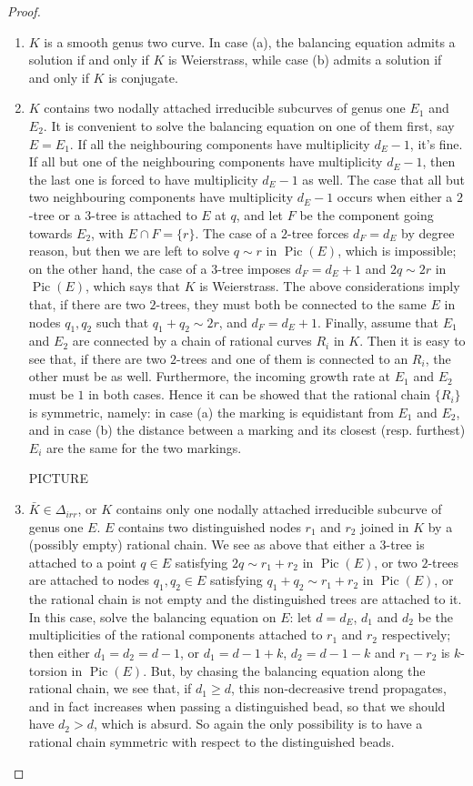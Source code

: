 \documentclass[11pt]{amsart}
\newcommand{\Pic}{\operatorname{Pic}}
\theoremstyle{plain}
\theoremstyle{definition}
\begin{document}
\begin{proof}
\begin{enumerate}
 \item $K$ is a smooth genus two curve. In case (a), the balancing equation admits a solution if and only if $K$ is Weierstrass, while case (b) admits a solution if and only if $K$ is conjugate.
 
 \item $K$ contains two nodally attached irreducible subcurves of genus one $E_1$ and $E_2$. It is convenient to solve the balancing equation on one of them first, say $E=E_1$. If all the neighbouring components have multiplicity $d_E-1$, it's fine. If all but one of the neighbouring components have multiplicity $d_E-1$, then the last one is forced to have multiplicity $d_E-1$ as well. The case that all but two neighbouring components have multiplicity $d_E-1$ occurs when either a $2$-tree or a $3$-tree is attached to $E$ at $q$, and let $F$ be the component going towards $E_2$, with $E\cap F=\{r\}$. The case of a $2$-tree forces $d_F=d_E$ by degree reason, but then we are left to solve $q\sim r$ in $\Pic(E)$, which is impossible; on the other hand, the case of a $3$-tree imposes $d_F=d_E+1$ and $2q\sim 2r$ in $\Pic(E)$, which says that $K$ is Weierstrass. The above considerations imply that, if there are two $2$-trees, they must both be connected to the same $E$ in nodes $q_1,q_2$ such that $q_1+q_2\sim 2r$, and $d_F=d_E+1$. Finally, assume that $E_1$ and $E_2$ are connected by a chain of rational curves $R_i$ in $K$. Then it is easy to see that, if there are two $2$-trees and one of them is connected to an $R_i$, the other must be as well. Furthermore, the incoming growth rate at $E_1$ and $E_2$ must be $1$ in both cases. Hence it can be showed that the rational chain $\{R_i\}$ is symmetric, namely: in case (a) the marking is equidistant from $E_1$ and $E_2$, and in case (b) the distance between a marking and its closest (resp. furthest) $E_i$ are the same for the two markings.
 
 PICTURE
 
 \item $\bar K\in\Delta_{irr}$, or $K$ contains only one nodally attached irreducible subcurve of genus one $E$. $E$ contains two distinguished nodes $r_1$ and $r_2$ joined in $K$ by a (possibly empty) rational chain. We see as above that either a $3$-tree is attached to a point $q\in E$ satisfying $2q\sim r_1+r_2$ in $\Pic(E)$, or two $2$-trees are attached to nodes $q_1,q_2\in E$ satisfying $q_1+q_2\sim r_1+r_2$ in $\Pic(E)$, or the rational chain is not empty and the distinguished trees are attached to it. In this case, solve the balancing equation on $E$: let $d=d_E$, $d_1$ and $d_2$ be the multiplicities of the rational components attached to $r_1$ and $r_2$ respectively; then either $d_1=d_2=d-1$, or $d_1=d-1+k$, $d_2=d-1-k$ and $r_1-r_2$ is $k$-torsion in $\Pic(E)$. But, by chasing the balancing equation along the rational chain, we see that, if $d_1\geq d$, this non-decreasive trend propagates, and in fact increases when passing a distinguished bead, so that we should have $d_2>d$, which is absurd. So again the only possibility is to have a rational chain symmetric with respect to the distinguished beads.
 

\end{enumerate}
\end{proof}
\end{document}
